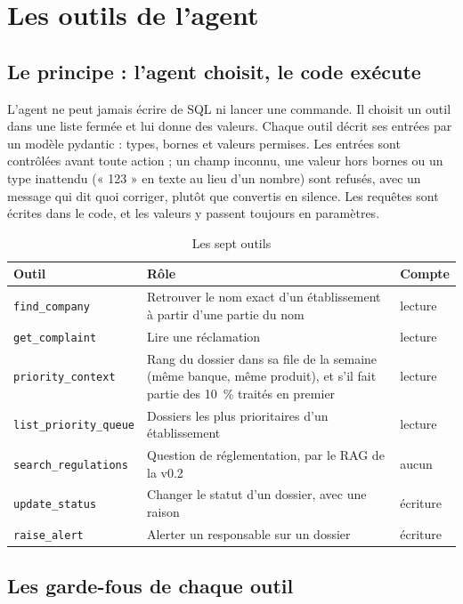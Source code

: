 \documentclass[11pt,a4paper]{article}
\begin{document}
\section{Les outils de l'agent}

\subsection{Le principe : l'agent choisit, le code exécute}

L'agent ne peut jamais écrire de SQL ni lancer une commande. Il choisit un outil dans une liste fermée et lui donne des valeurs. Chaque outil décrit ses entrées par un modèle pydantic : types, bornes et valeurs permises. Les entrées sont contrôlées avant toute action ; un champ inconnu, une valeur hors bornes ou un type inattendu (« 123 » en texte au lieu d'un nombre) sont refusés, avec un message qui dit quoi corriger, plutôt que convertis en silence. Les requêtes sont écrites dans le code, et les valeurs y passent toujours en paramètres.

\begin{table}[H]
\centering\small
\begin{tabularx}{\linewidth}{@{}l Y l@{}}
\toprule
Outil & Rôle & Compte \\
\midrule
\texttt{find\_company} & Retrouver le nom exact d'un établissement à partir d'une partie du nom & lecture \\
\texttt{get\_complaint} & Lire une réclamation & lecture \\
\texttt{priority\_context} & Rang du dossier dans sa file de la semaine (même banque, même produit), et s'il fait partie des 10~\% traités en premier & lecture \\
\texttt{list\_priority\_queue} & Dossiers les plus prioritaires d'un établissement & lecture \\
\texttt{search\_regulations} & Question de réglementation, par le RAG de la v0.2 & aucun \\
\texttt{update\_status} & Changer le statut d'un dossier, avec une raison & écriture \\
\texttt{raise\_alert} & Alerter un responsable sur un dossier & écriture \\
\bottomrule
\end{tabularx}
\caption{Les sept outils}
\end{table}

\subsection{Les garde-fous de chaque outil}
\end{document}
